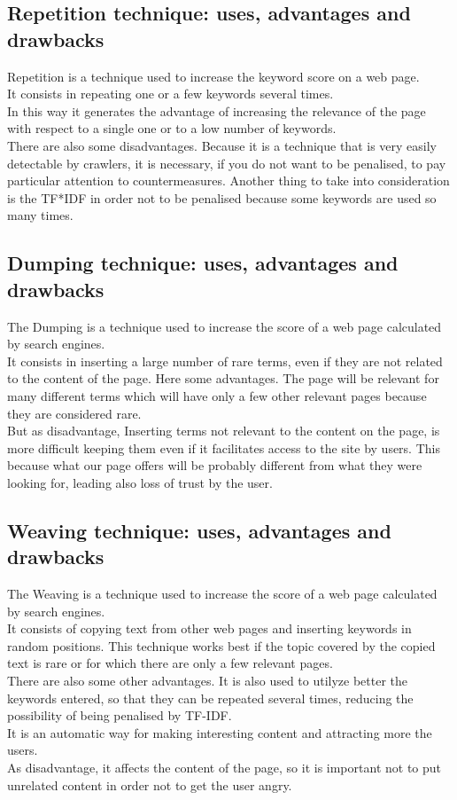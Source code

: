 \subsection{Repetition technique: uses, advantages and drawbacks}
Repetition is a technique used to increase the keyword score on a web page.\\
It consists in repeating one or a few keywords several times.\\
In this way
it generates the advantage of
increasing the relevance of the page with respect to a single one
or to a low number of keywords.\\ There are also some disadvantages.
Because it is a technique that is very easily
detectable by crawlers, it is necessary, if you do not want to be penalised,
to pay particular attention to countermeasures.
Another thing to take into consideration is the TF*IDF in order not to be
penalised because some keywords are used so many times.

\newpage

\subsection{Dumping technique: uses, advantages and drawbacks}
The Dumping is a technique used to increase the score of a
web page calculated by search engines.\\
It consists in inserting a large number of rare terms, even if they
are not related to the content of the page. Here some advantages.
The page will be relevant for many different terms which will have only
a few other relevant pages because they are considered rare.\\
But as disadvantage,
Inserting terms not relevant to the content on the page, is more difficult
keeping them even if it facilitates access to the site by users.
This because what our page offers will be probably different from what
they were looking for, leading also loss of trust by the user.

\subsection{Weaving technique: uses, advantages and drawbacks}
The Weaving is a technique used to increase the score of a web page
calculated by search engines.\\
It consists of copying text from other web pages and inserting keywords
in random positions.
This technique works best if the topic covered by the copied text is rare
or for which there are only a few relevant pages.\\
There are also some other advantages. It is also used to utilyze better
the keywords entered,
so that they can be repeated several times, reducing the possibility
of being penalised by TF-IDF.\\ It is an automatic way for making
interesting content and attracting more the users.\\
As disadvantage, it affects the content of the page, so
it is important not to put unrelated content in order not to get the user
angry.

